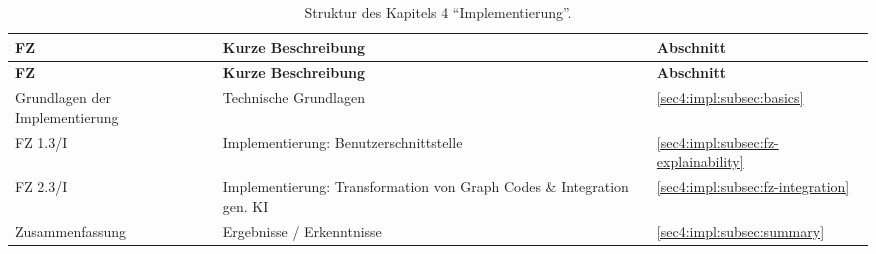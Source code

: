 {
    \def\arraystretch{1.1}%
    \begin{xltabular}{\linewidth}{
            @{}
            >{
                \linewidth
                \raggedright\arraybackslash
            }X
            >{
                \linewidth
                \raggedright\arraybackslash
            }X
            >{
                \linewidth
                \centering\arraybackslash
            }X
            @{}
    }


    \caption{Struktur des Kapitels 4 \enquote{Implementierung}.}
    \label{sec4:impl:table:structure} \\

    \toprule

    \textbf{FZ} & \textbf{Kurze Beschreibung} & \textbf{Abschnitt} \\

    \midrule

    \endfirsthead


    \toprule

    \textbf{FZ} & \textbf{Kurze Beschreibung} & \textbf{Abschnitt} \\

    \midrule

    \endhead


    Grundlagen der Implementierung & Technische Grundlagen & \cref{sec4:impl:subsec:basics} \\
    FZ 1.3/I & Implementierung: Benutzerschnittstelle & \cref{sec4:impl:subsec:fz-explainability} \\
    FZ 2.3/I & Implementierung: Transformation von Graph Codes \& Integration gen. KI & \cref{sec4:impl:subsec:fz-integration} \\
    Zusammenfassung & Ergebnisse / Erkenntnisse & \cref{sec4:impl:subsec:summary} \\

    \bottomrule

    \end{xltabular}
}
